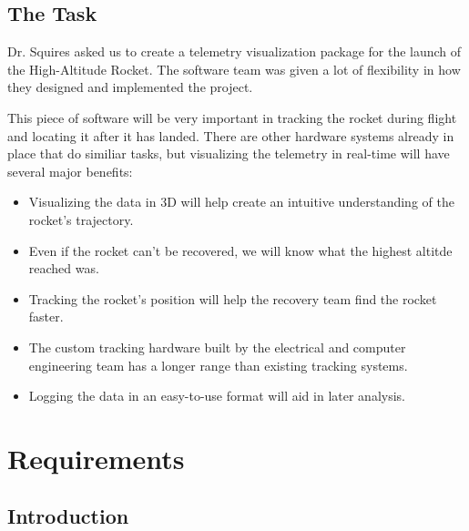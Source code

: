 \documentclass[10pt,draftclsnofoot,onecolumn]{IEEEtran}
\begin{document}
	
	\subsection{The Task}
	Dr. Squires asked us to create a telemetry visualization package for the launch
	of the High-Altitude Rocket.
	The software team was given a lot of flexibility in how they designed and implemented the project.
	
	This piece of software will be very important in tracking the rocket during flight and locating
	it after it has landed.
	There are other hardware systems already in place that do similiar tasks, but visualizing
	the telemetry in real-time will have several major benefits:
	
	\begin{itemize}
		\item Visualizing the data in 3D will help create an intuitive understanding of the rocket's trajectory.
		\item Even if the rocket can't be recovered, we will know what the highest altitde reached was.
		\item Tracking the rocket's position will help the recovery team find the rocket faster.
		\item The custom tracking hardware built by the electrical and computer engineering team has a longer range than existing tracking systems.
		\item Logging the data in an easy-to-use format will aid in later analysis.
	\end{itemize}



	
	
	
	
	
	
	
	
	
	
	
	
	
	
	
	
	
	
	
	
	


\newpage
\section{Requirements}




	\subsection{Introduction}
\end{document}
